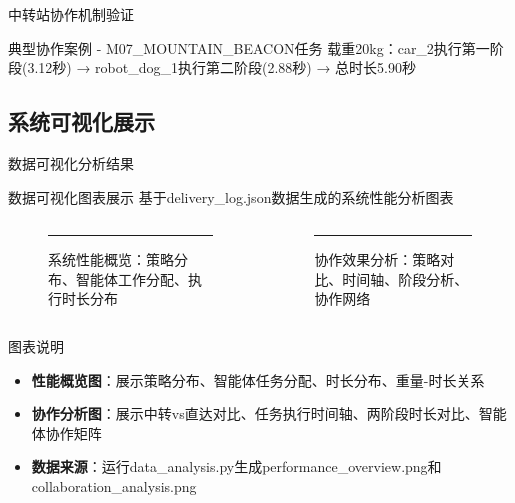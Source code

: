 \documentclass[
10pt,
aspectratio=169,
]{beamer}
\begin{document}
\begin{frame}{中转站协作机制验证}
    \begin{block}{典型协作案例 - M07\_MOUNTAIN\_BEACON任务}
        载重20kg：car\_2执行第一阶段(3.12秒) → robot\_dog\_1执行第二阶段(2.88秒) → 总时长5.90秒
    \end{block}
\end{frame}

\subsection{系统可视化展示}

\begin{frame}{数据可视化分析结果}
    \begin{block}{数据可视化图表展示}
        基于delivery\_log.json数据生成的系统性能分析图表
    \end{block}
    
    \begin{columns}
        \begin{column}{0.5\textwidth}
            \begin{figure}[htbp]
                \centering
                \rule{5.5cm}{4cm}
                \caption{系统性能概览：策略分布、智能体工作分配、执行时长分布}
            \end{figure}
        \end{column}
        \begin{column}{0.5\textwidth}
            \begin{figure}[htbp]
                \centering
                \rule{5.5cm}{4cm}
                \caption{协作效果分析：策略对比、时间轴、阶段分析、协作网络}
            \end{figure}
        \end{column}
    \end{columns}
    
    \begin{alertblock}{图表说明}
        \begin{itemize}
            \item \textbf{性能概览图}：展示策略分布、智能体任务分配、时长分布、重量-时长关系
            \item \textbf{协作分析图}：展示中转vs直达对比、任务执行时间轴、两阶段时长对比、智能体协作矩阵
            \item \textbf{数据来源}：运行data\_analysis.py生成performance\_overview.png和collaboration\_analysis.png
        \end{itemize}
    \end{alertblock}
\end{frame}
\end{document}
